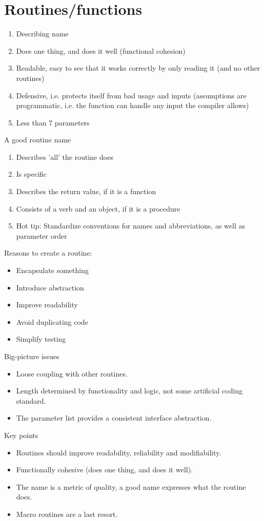 \section{Routines/functions}
\begin{enumerate}
    \item Describing name
    \item Does one thing, and does it well (functional cohesion)
    \item Readable, easy to see that it works correctly by only reading it (and no other routines)
    \item Defensive, i.e. protects itself from bad usage and inputs (assumptions are programmatic, i.e. the function can handle any input the compiler allows)
    \item Less than 7 parameters
\end{enumerate}
A good routine name
\begin{enumerate}
    \item Describes 'all' the routine does
    \item Is specific
    \item Describes the return value, if it is a function
    \item Consists of a verb and an object, if it is a procedure
    \item Hot tip: Standardize conventions for names and abbreviations, as well as parameter order
\end{enumerate}
Reasons to create a routine:
\begin{itemize}
    \item Encapsulate something
    \item Introduce abstraction
    \item Improve readability
    \item Avoid duplicating code
    \item Simplify testing
\end{itemize}
Big-picture issues
\begin{itemize}
    \item Loose coupling with other routines.
    \item Length determined by functionality and logic, not some artificial coding standard.
    \item The parameter list provides a consistent interface abstraction.
\end{itemize}
Key points
\begin{itemize}
    \item Routines should improve readability, reliability and modifiability.
    \item Functionally cohesive (does one thing, and does it well).
    \item The name is a metric of quality, a good name expresses what the routine does.
    \item Macro routines are a last resort.
\end{itemize}

